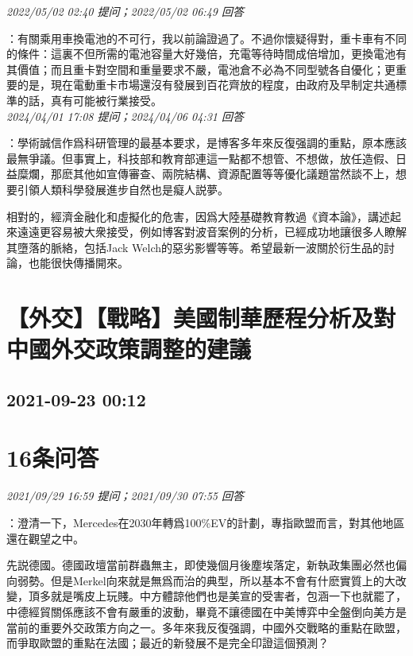 \documentclass[twocolumn]{ctexart}
\begin{document}
\textit{\hfill\noindent\small 2022/05/02 02:40 提问；2022/05/02 06:49 回答}

：有關乘用車換電池的不可行，我以前論證過了。不過你懷疑得對，重卡車有不同的條件：這裏不但所需的電池容量大好幾倍，充電等待時間成倍增加，更換電池有其價值；而且重卡對空間和重量要求不嚴，電池倉不必為不同型號各自優化；更重要的是，現在電動重卡市場還沒有發展到百花齊放的程度，由政府及早制定共通標準的話，真有可能被行業接受。
\\

\textit{\hfill\noindent\small 2024/04/01 17:08 提问；2024/04/06 04:31 回答}

：學術誠信作爲科研管理的最基本要求，是博客多年來反復强調的重點，原本應該最無爭議。但事實上，科技部和教育部連這一點都不想管、不想做，放任造假、日益糜爛，那麽其他如宣傳審查、兩院結構、資源配置等等優化議題當然談不上，想要引領人類科學發展進步自然也是癡人説夢。

相對的，經濟金融化和虛擬化的危害，因爲大陸基礎教育教過《資本論》，講述起來遠遠更容易被大衆接受，例如博客對波音案例的分析，已經成功地讓很多人瞭解其墮落的脈絡，包括Jack Welch的惡劣影響等等。希望最新一波關於衍生品的討論，也能很快傳播開來。
\\


\section{【外交】【戰略】美國制華歷程分析及對中國外交政策調整的建議}
\subsection{2021-09-23 00:12}


\section{16条问答}

\textit{\hfill\noindent\small 2021/09/29 16:59 提问；2021/09/30 07:55 回答}

：澄清一下，Mercedes在2030年轉爲100\%EV的計劃，專指歐盟而言，對其他地區還在觀望之中。


先説德國。德國政壇當前群蟲無主，即使幾個月後塵埃落定，新執政集團必然也偏向弱勢。但是Merkel向來就是無爲而治的典型，所以基本不會有什麽實質上的大改變，頂多就是嘴皮上玩賤。中方體諒他們也是美宣的受害者，包涵一下也就罷了，中德經貿關係應該不會有嚴重的波動，畢竟不讓德國在中美博弈中全盤倒向美方是當前的重要外交政策方向之一。多年來我反復强調，中國外交戰略的重點在歐盟，而爭取歐盟的重點在法國；最近的新發展不是完全印證這個預測？
\end{document}
